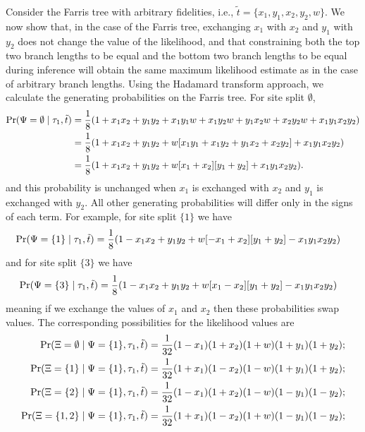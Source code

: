 Consider the Farris tree with arbitrary fidelities, i.e., $\tilde{t}=\{x_1,y_1,x_2,y_2,w\}$.
We now show that, in the case of the Farris tree, exchanging $x_1$ with $x_2$ and $y_1$ with $y_2$ does not change the value of the likelihood, and that constraining both the top two branch lengths to be equal and the bottom two branch lengths to be equal during inference will obtain the same maximum likelihood estimate as in the case of arbitrary branch lengths.
Using the Hadamard transform approach, we calculate the generating probabilities on the Farris tree.
For site split $\emptyset$,
\begin{align*}
    \Pr(\Psi=\emptyset\mid \tau_1, \tilde{t}) & = \frac{1}{8} (1 + x_1x_2 +  y_1y_2 +  x_1y_1w + x_1y_2w + y_1x_2w + x_2y_2w + x_1y_1x_2y_2) \\
                                              & = \frac{1}{8} (1 + x_1x_2 +  y_1y_2 +  w[x_1y_1 + x_1y_2 + y_1x_2 + x_2y_2] + x_1y_1x_2y_2) \\
                                              & = \frac{1}{8} (1 + x_1x_2 +  y_1y_2 +  w[x_1 + x_2][y_1 + y_2] + x_1y_1x_2y_2).
\end{align*}
and this probability is unchanged when $x_1$ is exchanged with $x_2$ and $y_1$ is exchanged with $y_2$.
All other generating probabilities will differ only in the signs of each term.
For example, for site split $\{1\}$ we have
\begin{align*}
    \Pr(\Psi=\{1\}\mid \tau_1, \tilde{t}) & = \frac{1}{8} (1 - x_1x_2 +  y_1y_2 +  w[-x_1 + x_2][y_1 + y_2] - x_1y_1x_2y_2)
\end{align*}
and for site split $\{3\}$ we have
\begin{align*}
    \Pr(\Psi=\{3\}\mid \tau_1, \tilde{t}) & = \frac{1}{8} (1 - x_1x_2 +  y_1y_2 +  w[x_1 - x_2][y_1 + y_2] - x_1y_1x_2y_2)
\end{align*}
meaning if we exchange the values of $x_1$ and $x_2$ then these probabilities swap values.
The corresponding possibilities for the likelihood values are
\begin{align*}
    \Pr(\Xi=\emptyset \mid \Psi=\{1\}, \tau_1, \tilde{t}) &= \frac{1}{32}(1-x_1)(1+x_2)(1+w)(1+y_1)(1+y_2); \\
    \Pr(\Xi=\{1\} \mid \Psi=\{1\}, \tau_1, \tilde{t}) &= \frac{1}{32}(1+x_1)(1-x_2)(1-w)(1+y_1)(1+y_2); \\
    \Pr(\Xi=\{2\} \mid \Psi=\{1\}, \tau_1, \tilde{t}) &= \frac{1}{32}(1-x_1)(1+x_2)(1-w)(1-y_1)(1-y_2); \\
    \Pr(\Xi=\{1,2\} \mid \Psi=\{1\}, \tau_1, \tilde{t}) &= \frac{1}{32}(1+x_1)(1-x_2)(1+w)(1-y_1)(1-y_2);
\end{align*}
